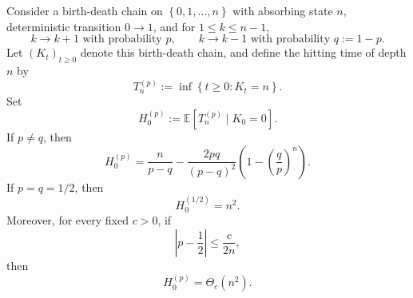 \documentclass{article}
\numberwithin{theorem}{section}
\numberwithin{proposition}{section}
\numberwithin{corollary}{section}
\numberwithin{lemma}{section}
\numberwithin{conjecture}{section}
\numberwithin{remark}{section}
\numberwithin{definition}{section}
\numberwithin{assumption}{section}
\numberwithin{example}{section}
\newcommand{\bbE}{\mathbb{E}}
\newcommand{\lbra}[1]{\left[#1\right]}
\newcommand{\mbra}[1]{\left\{#1\right\}}
\newcommand{\sbra}[1]{\left(#1\right)}
\newcommand{\abs}[1]{\left| #1\right|}
\begin{document}
\begin{lemma}
\label{lem:biased_reflecting_walk_hitting}
Consider a birth-death chain on $\mbra{0,1,\dots,n}$ with absorbing state $n$, deterministic transition $0\to1$, and for $1\le k\le n-1$,
\begin{equation*}
    k\to k+1 \text{ with probability } p, \qquad
    k\to k-1 \text{ with probability } q:=1-p.
\end{equation*}
Let $(K_t)_{t\ge0}$ denote this birth-death chain, and define the hitting time of depth $n$ by
\begin{equation*}
    T_n^{(p)}:=\inf\mbra{t\ge0:K_t=n}.
\end{equation*}
Set
\begin{equation*}
    H_0^{(p)}:=\bbE\lbra{T_n^{(p)}\mid K_0=0}.
\end{equation*}
If $p\ne q$, then
\begin{equation*}
    H_0^{(p)}
    =
    \frac{n}{p-q}
    -
    \frac{2pq}{(p-q)^2}\sbra{1-\sbra{\frac{q}{p}}^n}.
\end{equation*}
If $p=q=1/2$, then
\begin{equation*}
    H_0^{(1/2)}=n^2.
\end{equation*}
Moreover, for every fixed $c>0$, if
\begin{equation*}
    \abs{p-\frac12}\le \frac{c}{2n},
\end{equation*}
then
\begin{equation*}
    H_0^{(p)}=\Theta_c(n^2).
\end{equation*}
\end{lemma}
\end{document}
